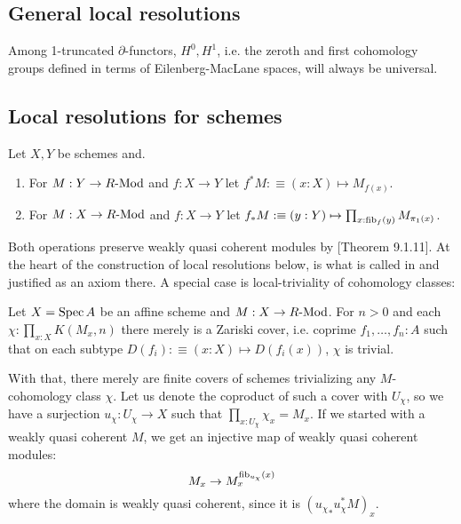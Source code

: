 
\subsection{General local resolutions}

Among 1-truncated $\partial$-functors, $H^0, H^1$, i.e. the zeroth and first cohomology groups defined in terms of Eilenberg-MacLane spaces, will always be universal.

\subsection{Local resolutions for schemes}

\begin{definition}
  Let $X,Y$ be schemes and.
  \begin{enumerate}
  \item For $M:Y\to R\text{-}\mathrm{Mod}$ and $f:X\to Y$ let $f^*M:\equiv (x:X)\mapsto M_{f(x)}$.
  \item For $M:X\to R\text{-}\mathrm{Mod}$ and $f:X\to Y$ let $f_*M:\equiv (y:Y)\mapsto \prod_{x:\mathrm{fib}_f(y)}M_{\pi_1(x)}$.
  \end{enumerate}
\end{definition}

Both operations preserve weakly quasi coherent modules by \cite{draft}[Theorem 9.1.11].
At the heart of the construction of local resolutions below,
is what is called  in \cite{draft} and justified as an axiom there.
A special case is local-triviality of cohomology classes:

\begin{axiom}
  Let $X=\operatorname{Spec} A$ be an affine scheme and $M:X\to R\text{-}\mathrm{Mod}$.
  For $n>0$ and each $\chi:\prod_{x:X}K(M_x,n)$ there merely is a Zariski cover,
  i.e. coprime
  $f_1,\dots,f_n:A$ such that on each subtype $D(f_i):\equiv (x:X)\mapsto D(f_i(x))$,
  $\chi$ is trivial.
\end{axiom}

With that, there merely are finite covers of schemes trivializing any $M$-cohomology class $\chi$.
Let us denote the coproduct of such a cover with $U_\chi$,
so we have a surjection $u_\chi:U_\chi\to X$ such that $\prod_{x:U_\chi}\chi_x=M_x$.
If we started with a weakly quasi coherent $M$,
we get an injective map of weakly quasi coherent modules:
\[
  M_x \to M_x^{\mathrm{fib}_{u_\chi}(x)}
\]
where the domain is weakly quasi coherent, since it is $({u_\chi}_*u_\chi^*M)_x$.

